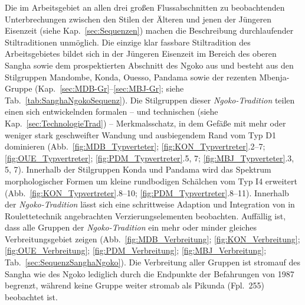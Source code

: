 Die im Arbeitsgebiet an allen drei großen Flussabschnitten zu beobachtenden Unterbrechungen zwischen den Stilen der Älteren und jenen der Jüngeren Eisenzeit (siehe Kap.~\ref{sec:Sequenzen}) machen die Beschreibung durchlaufender Stiltraditionen unmöglich. Die einzige klar fassbare Stiltradition des Arbeitsgebietes bildet sich in der Jüngeren Eisenzeit im Bereich des oberen \mbox{Sangha} sowie dem prospektierten Abschnitt des \mbox{Ngoko} aus und besteht aus den Stilgruppen Mandombe, Konda, Ouesso, Pandama sowie der rezenten Mbenja-Gruppe (Kap.~\ref{sec:MDB-Gr}--\ref{sec:MBJ-Gr}; siehe Tab.~\ref{tab:SanghaNgokoSequenz}). Die Stilgruppen dieser \textit{\mbox{Ngoko}-Tradition} teilen einen sich entwickelnden formalen -- und technischen (siehe Kap.~\ref{sec:TechnologieTrad}) -- Merkmalsschatz, in dem Gefäße mit mehr oder weniger stark geschweifter Wandung und ausbiegendem Rand vom Typ D1 dominieren (Abb.~\ref{fig:MDB_Typverteter}; \ref{fig:KON_Typvertreter}.2--7; \ref{fig:OUE_Typvertreter}; \ref{fig:PDM_Typvertreter}.5, 7; \ref{fig:MBJ_Typverteter}.3, 5, 7). Innerhalb der Stilgruppen Konda und Pandama wird das Spektrum morphologischer Formen um kleine rundbodigen Schälchen vom Typ I4 erweitert (Abb.~\ref{fig:KON_Typvertreter}.8--10; \ref{fig:PDM_Typvertreter}.8--11). Innerhalb der \textit{\mbox{Ngoko}-Tradition} lässt sich eine schrittweise Adaption und Integration von in Rou\-lette\-technik angebrachten Verzierungselementen beobachten. Auffällig ist, dass alle Gruppen der \textit{\mbox{Ngoko}-Tradition} ein mehr oder minder gleiches Verbreitungsgebiet zeigen (Abb.~\ref{fig:MDB_Verbreitung}; \ref{fig:KON_Verbreitung}; \ref{fig:OUE_Verbreitung}; \ref{fig:PDM_Verbreitung}; \ref{fig:MBJ_Verbreitung}; Tab.~\ref{sec:SequenzSanghaNgoko}). Die Verbreitung aller Gruppen ist stromauf des \mbox{Sangha} wie des \mbox{Ngoko} lediglich durch die Endpunkte der Befahrungen von 1987 begrenzt, während keine Gruppe weiter stromab als Pikunda (Fpl.~255) beobachtet ist.

